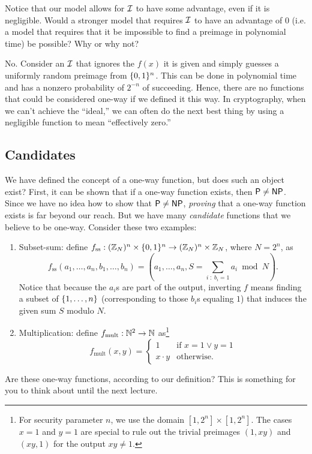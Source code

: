 \documentclass[11pt]{article}
\begin{document}
\begin{question}
    Notice that our model allows for \(\mathcal{I}\) to have some advantage, even if it is
    negligible. Would a stronger model that requires \(\mathcal{I}\) to have an advantage of 0
    (i.e. a model that requires that it be impossible to find a preimage in
    polynomial time) be possible? Why or why not?
\end{question}
\begin{answer}
    No. Consider an \(\mathcal{I}\) that ignores the \(f(x)\) it is given and simply guesses a
    uniformly random preimage from \(\{0,1\}^n\). This can be done in polynomial time and
    has a nonzero probability of \(2^{-n}\) of succeeding. Hence, there are no functions
    that could be considered one-way if we defined it this way. In cryptography, when we
    can't achieve the ``ideal,'' we can often do the next best thing by using a
    negligible function to mean ``effectively zero.''
\end{answer}

\subsection{Candidates}
\label{sec:candidates}

We have defined the concept of a one-way function, but does such an
object exist?  First, it can be shown that if a one-way function
exists, then $\mathsf{P} \neq \mathsf{NP}$.  Since we have no idea how to show that
$\mathsf{P} \neq \mathsf{NP}$, \emph{proving} that a one-way function exists is far
beyond our reach.  But we have many \emph{candidate} functions that we
believe to be one-way.  Consider these two examples:
\begin{enumerate}
\item Subset-sum: define $f_{\text{ss}} : (\mathbb{Z}_{N})^{n} \times \{0,1\}^{n}
  \to (\mathbb{Z}_{N})^{n} \times \mathbb{Z}_{N}$, where $N = 2^{n}$, as \[
  f_{\text{ss}}(a_{1}, \ldots, a_{n}, b_{1}, \ldots, b_{n}) = (a_{1},
  \ldots, a_{n}, S = \sum_{i\; :\; b_{i} = 1} a_{i} \bmod N). \]
  Notice that because the $a_{i}$s are part of the output, inverting
  $f$ means finding a subset of $\{1,\ldots,n\}$ (corresponding to
  those $b_{i}$s equaling $1$) that induces the given sum $S$ modulo
  $N$.
\item Multiplication: define $f_{\text{mult}} : \mathbb{N}^{2} \to \mathbb{N}$
  as\footnote{For security parameter $n$, we use the domain $[1,2^{n}]
    \times [1,2^{n}]$.  The cases $x=1$ and $y=1$ are special to rule
    out the trivial preimages $(1,xy)$ and $(xy, 1)$ for the output
    $xy \neq 1$.}
  \[
  f_{\text{mult}}(x,y) =
  \begin{cases}
    1 & \text{if } x=1 \vee y=1 \\
    x \cdot y & \text{otherwise.}
  \end{cases}
  \]
\end{enumerate}

Are these one-way functions, according to our definition?  This is
something for you to think about until the next lecture.
\end{document}
